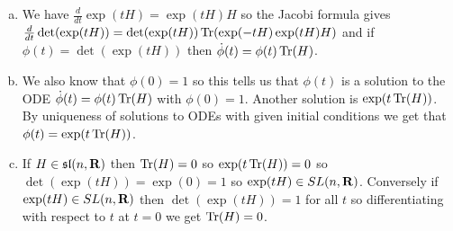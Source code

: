 \documentclass[12pt]{article}
\begin{document}
\begin{answer}
\begin{enumerate}[(a)]
\item We have $\frac{d}{dt}\exp(tH)=\exp(tH)H$ so the Jacobi formula gives $\frac{d}{dt}\det(\exp(tH))=\det(\exp(tH))\operatorname{Tr}(\exp(-tH)\exp(tH)H)$ and if $\phi(t)=\det(\exp(tH))$ then $\dot{\phi}(t)=\phi(t)\operatorname{Tr}(H)$.
\item We also know that $\phi(0)=1$ so this tells us that $\phi(t)$ is a solution to the ODE $\dot{\phi}(t)=\phi(t)\operatorname{Tr}(H)$ with $\phi(0)=1$. Another solution is $\exp(t\operatorname{Tr}(H))$. By uniqueness of solutions to ODEs with given initial conditions we get that $\phi(t)=\exp(t\operatorname{Tr}(H))$.
\item If $H\in\mathfrak{sl}(n,\mathbf{R})$ then $\operatorname{Tr}(H)=0$ so $\exp(t\operatorname{Tr}(H))=0$ so $\det(\exp(tH))=\exp(0)=1$ so $\exp(tH)\in SL(n,\mathbf{R})$. Conversely if $\exp(tH)\in SL(n,\mathbf{R})$ then $\det(\exp(tH))=1$ for all $t$ so differentiating with respect to $t$ at $t=0$ we get $\operatorname{Tr}(H)=0$.
\end{enumerate}
\end{answer}
\end{document}
